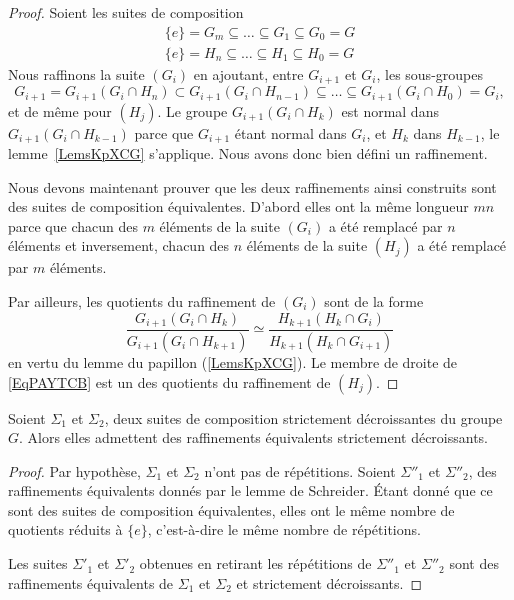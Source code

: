 \begin{proof}
	Soient les suites de composition
	\begin{subequations}
		\begin{align}
			\{ e \}=G_m\subseteq\ldots\subseteq G_1\subseteq G_0=G \\
			\{ e \}=H_n\subseteq\ldots\subseteq H_1\subseteq H_0=G
		\end{align}
	\end{subequations}
    Nous raffinons la suite \( (G_i)\) en ajoutant, entre \( G_{i+1}\) et \( G_i\), les sous-groupes
	\begin{equation}
		G_{i+1}=G_{i+1}(G_i\cap H_n)\subset G_{i+1}(G_i\cap H_{n-1})\subseteq\ldots\subseteq G_{i+1}(G_i\cap H_0)=G_i,
	\end{equation}
	et de même pour \( (H_j)\). Le groupe \( G_{i+1}(G_i\cap H_k)\) est normal dans \( G_{i+1}(G_i\cap H_{k-1})\) parce que \( G_{i+1}\) étant normal dans \( G_i\), et \( H_k\) dans \( H_{k-1}\), le lemme~\ref{LemsKpXCG} s'applique. Nous avons donc bien défini un raffinement.

	Nous devons maintenant prouver que les deux raffinements ainsi construits sont des suites de composition équivalentes. D'abord elles ont la même longueur \( mn\) parce que chacun des \( m\) éléments de la suite \( (G_i)\) a été remplacé par \( n\) éléments et inversement, chacun des \( n\) éléments de la suite \( (H_j)\) a été remplacé par \( m\) éléments.

	Par ailleurs, les quotients du raffinement de \( (G_i)\) sont de la forme
	\begin{equation}    \label{EqPAYTCB}
		\frac{ G_{i+1}(G_i \cap H_k) }{ G_{i+1}(G_i\cap H_{k+1}) }\simeq \frac{ H_{k+1}(H_k\cap G_i) }{ H_{k+1}(H_k\cap G_{i+1}) }
	\end{equation}
	en vertu du lemme du papillon (\ref{LemsKpXCG}). Le membre de droite de \eqref{EqPAYTCB} est un des quotients du raffinement de \( (H_j)\).
\end{proof}

\begin{lemma}    \label{LemBSicRJ}
	Soient \( \Sigma_1\) et \( \Sigma_2\), deux suites de composition strictement décroissantes du groupe \( G\). Alors elles admettent des raffinements équivalents strictement décroissants.
\end{lemma}

\begin{proof}
	Par hypothèse, \( \Sigma_1\) et \( \Sigma_2\) n'ont pas de répétitions. Soient \( \Sigma''_1\) et \( \Sigma''_2\), des raffinements équivalents donnés par le lemme de Schreider. Étant donné que ce sont des suites de composition équivalentes, elles ont le même nombre de quotients réduits à \( \{ e \}\), c'est-à-dire le même nombre de répétitions.

	Les suites \( \Sigma'_1\) et \( \Sigma'_2\) obtenues en retirant les répétitions de \( \Sigma''_1\) et \( \Sigma''_2\) sont des raffinements équivalents de \( \Sigma_1\) et \( \Sigma_2\) et strictement décroissants.
\end{proof}

